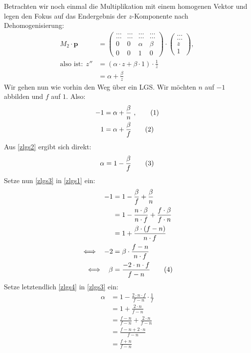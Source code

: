 \documentclass[a4paper,parskip=full*]{scrartcl}
\newcommand{\bvec}[1]{\ensuremath{\mathbf{#1}}}
\newcommand\numberthis{\addtocounter{equation}{1}\tag{\theequation}}
\begin{document}
Betrachten wir noch einmal die Multiplikation mit einem homogenen
Vektor und legen den Fokus auf das Endergebnis der $z$-Komponente nach
Dehomogenisierung:
\begin{align*}
	M_2 \cdot \bvec{p} &=
	\begin{pmatrix}
		\dots & \dots & \dots & \dots  \\
		\dots & \dots & \dots & \dots  \\
		0 & 0 & \alpha & \beta  \\
		0 & 0 & 1 & 0
	\end{pmatrix}
	\cdot
	\begin{pmatrix}
		\dots \\ \dots \\ z \\ 1
	\end{pmatrix}, \\
	\text{also ist:}  ~~  z'' &= \left( \alpha \cdot z + \beta \cdot 1 \right) \cdot \frac{1}{z}  \\
	                          &= \alpha + \frac{\beta}{z}
\end{align*}
Wir gehen nun wie vorhin den Weg über ein LGS. Wir möchten $n$ auf $-1$
abbilden und $f$ auf $1$. Also:
\begin{align*}
	-1 &= \alpha + \frac{\beta}{n} ~ , \numberthis\label{zlgs1}  \\
	 1 &= \alpha + \frac{\beta}{f}  \numberthis\label{zlgs2}
\end{align*}
Aus \eqref{zlgs2} ergibt sich direkt:
\begin{align*}
	\alpha = 1 - \frac{\beta}{f}  \numberthis\label{zlgs3}
\end{align*}
Setze nun \eqref{zlgs3} in \eqref{zlgs1} ein:
\begin{align*}
	-1 &= 1 - \frac{\beta}{f} + \frac{\beta}{n}  \\
	   &= 1 - \frac{n \cdot \beta}{n \cdot f} + \frac{f \cdot \beta}{f \cdot n}  \\
	   &= 1 + \frac{\beta \cdot (f - n)}{n \cdot f}  \\
	\iff ~~ -2 &= \beta \cdot \frac{f - n}{n \cdot f}  \\
	\iff ~~ \beta &= \frac{-2 \cdot n \cdot f}{f - n}  \numberthis\label{zlgs4}
\end{align*}
Setze letztendlich \eqref{zlgs4} in \eqref{zlgs3} ein:
\begin{align*}
	\alpha &= 1 - \frac{2 \cdot n \cdot f}{f - n} \cdot \frac{1}{f}  \\
	       &= 1 + \frac{2 \cdot n}{f - n}  \\
	       &= \frac{f - n}{f - n} + \frac{2 \cdot n}{f - n}  \\
	       &= \frac{f - n + 2 \cdot n}{f - n}  \\
	       &= \frac{f + n}{f - n}
\end{align*}
\end{document}
